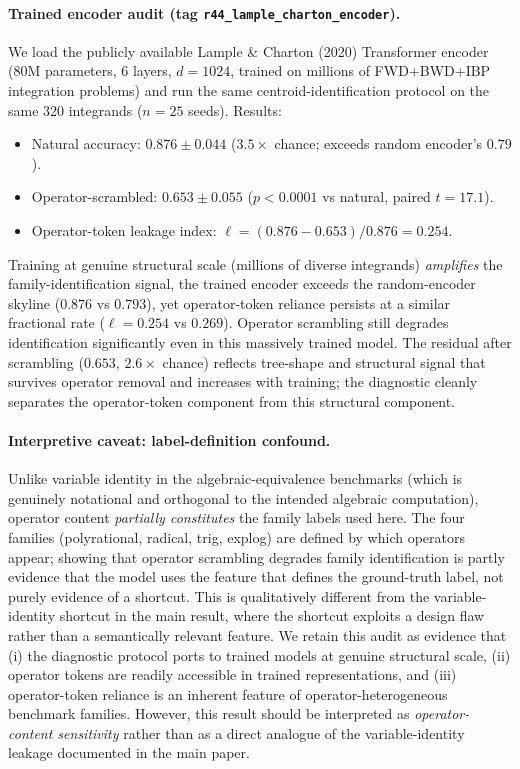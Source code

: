 \paragraph{Trained encoder audit (tag \texttt{r44\_lample\_charton\_encoder}).} We load the publicly available Lample \& Charton (2020) Transformer encoder (80M parameters, 6 layers, $d{=}1024$, trained on millions of FWD+BWD+IBP integration problems) and run the same centroid-identification protocol on the same 320 integrands ($n{=}25$ seeds). Results:
\begin{itemize}[noitemsep]
  \item Natural accuracy: $0.876 \pm 0.044$ ($3.5\times$ chance; exceeds random encoder's $0.79$).
  \item Operator-scrambled: $0.653 \pm 0.055$ ($p{<}0.0001$ vs natural, paired $t{=}17.1$).
  \item Operator-token leakage index: $\ell = (0.876 - 0.653)/0.876 = 0.254$.
\end{itemize}
Training at genuine structural scale (millions of diverse integrands) \emph{amplifies} the family-identification signal, the trained encoder exceeds the random-encoder skyline ($0.876$ vs $0.793$), yet operator-token reliance persists at a similar fractional rate ($\ell{=}0.254$ vs $0.269$). Operator scrambling still degrades identification significantly even in this massively trained model. The residual after scrambling ($0.653$, $2.6\times$ chance) reflects tree-shape and structural signal that survives operator removal and increases with training; the diagnostic cleanly separates the operator-token component from this structural component.

\paragraph{Interpretive caveat: label-definition confound.} Unlike variable identity in the algebraic-equivalence benchmarks (which is genuinely notational and orthogonal to the intended algebraic computation), operator content \emph{partially constitutes} the family labels used here. The four families (polyrational, radical, trig, explog) are defined by which operators appear; showing that operator scrambling degrades family identification is partly evidence that the model uses the feature that defines the ground-truth label, not purely evidence of a shortcut. This is qualitatively different from the variable-identity shortcut in the main result, where the shortcut exploits a design flaw rather than a semantically relevant feature. We retain this audit as evidence that (i) the diagnostic protocol ports to trained models at genuine structural scale, (ii) operator tokens are readily accessible in trained representations, and (iii) operator-token reliance is an inherent feature of operator-heterogeneous benchmark families. However, this result should be interpreted as \emph{operator-content sensitivity} rather than as a direct analogue of the variable-identity leakage documented in the main paper.


